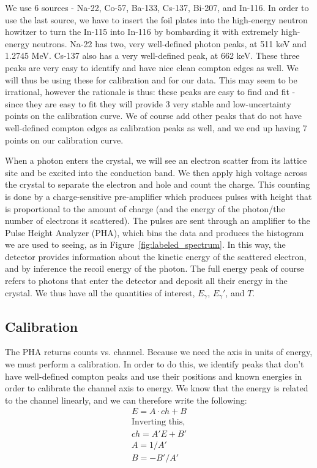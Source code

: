 \documentclass[reprint, nobibnotes, amssymb, amsmath, amsfonts, physics, mathtools, mathrsfs, floatfix]{revtex4-1}
\begin{document}
    \hspace{.25cm}

    We use 6 sources - Na-22, Co-57, Ba-133, Cs-137, Bi-207, and In-116.  In order to use the last source, we have to insert the foil plates into the high-energy neutron howitzer to turn the In-115 into In-116 by bombarding it with extremely high-energy neutrons.  Na-22 has two, very well-defined photon peaks, at 511 keV and 1.2745 MeV.  Cs-137 also has a very well-defined peak, at 662 keV.  These three peaks are very easy to identify and have nice clean compton edges as well.  We will thus be using these for calibration and for our data.  This may seem to be irrational, however the rationale is thus: these peaks are easy to find and fit - since they are easy to fit they will provide 3 very stable and low-uncertainty points on the calibration curve.  We of course add other peaks that do not have well-defined compton edges as calibration peaks as well, and we end up having 7 points on our calibration curve.

    \hspace{.25cm}

    When a photon enters the crystal, we will see an electron scatter from its lattice site and be excited into the conduction band.  We then apply high voltage across the crystal to separate the electron and hole and count the charge.  This counting is done by a charge-sensitive pre-amplifier which produces pulses with height that is proportional to the amount of charge (and the energy of the photon/the number of electrons it scattered).  The pulses are sent through an amplifier to the Pulse Height Analyzer (PHA), which bins the data and produces the histogram we are used to seeing, as in Figure~\ref{fig:labeled_spectrum}.  In this way, the detector provides information about the kinetic energy of the scattered electron, and by inference the recoil energy of the photon.  The full energy peak of course refers to photons that enter the detector and deposit all their energy in the crystal.  We thus have all the quantities of interest, $E_\gamma$, $E_\gamma'$, and $T$.

    \subsection{Calibration}
      The PHA returns counts vs. channel.  Because we need the axis in units of energy, we must perform a calibration.  In order to do this, we identify peaks that don't have well-defined compton peaks and use their positions and known energies in order to calibrate the channel axis to energy.  We know that the energy is related to the channel linearly, and we can therefore write the following:
      \begin{gather}
        E = A \cdot ch + B \label{eq:calibration}\\
        \text{Inverting this,}\nonumber \\
        ch = A'E + B' \\
        A = 1/A' \\
        B = -B'/A'
      \end{gather}
\end{document}
